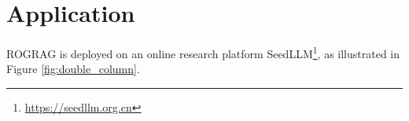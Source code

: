 \documentclass[11pt]{article}
\begin{document}

\section{Application}

ROGRAG is deployed on
an online research platform SeedLLM\footnote{\url{https://seedllm.org.cn}}, as illustrated in Figure \ref{fig:double_column}. 

\end{document}
